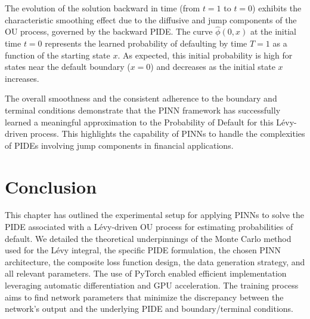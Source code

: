 \documentclass[11pt,twoside,openright]{report}
\begin{document}
The evolution of the solution backward in time (from $t=1$ to $t=0$) exhibits the characteristic smoothing effect due to the diffusive and jump components of the OU process, governed by the backward PIDE. The curve $\hat{\phi}(0, x)$ at the initial time $t=0$ represents the learned probability of defaulting by time $T=1$ as a function of the starting state $x$. As expected, this initial probability is high for states near the default boundary ($x=0$) and decreases as the initial state $x$ increases.
 
The overall smoothness and the consistent adherence to the boundary and terminal conditions demonstrate that the PINN framework has successfully learned a meaningful approximation to the Probability of Default for this Lévy-driven process. This highlights the capability of PINNs to handle the complexities of PIDEs involving jump components in financial applications.

\section{Conclusion}
\label{sec:exp_conclusion}

This chapter has outlined the experimental setup for applying PINNs to solve the PIDE associated with a Lévy-driven OU process for estimating probabilities of default. We detailed the theoretical underpinnings of the Monte Carlo method used for the Lévy integral, the specific PIDE formulation, the chosen PINN architecture, the composite loss function design, the data generation strategy, and all relevant parameters. The use of PyTorch enabled efficient implementation leveraging automatic differentiation and GPU acceleration. The training process aims to find network parameters that minimize the discrepancy between the network's output and the underlying PIDE and boundary/terminal conditions.
\end{document}
